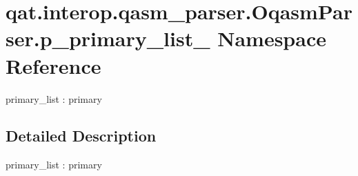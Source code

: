 \hypertarget{namespaceqat_1_1interop_1_1qasm__parser_1_1OqasmParser_1_1p__primary__list__0}{\section{qat.\-interop.\-qasm\-\_\-parser.\-Oqasm\-Parser.\-p\-\_\-primary\-\_\-list\-\_ Namespace Reference}
\label{namespaceqat_1_1interop_1_1qasm__parser_1_1OqasmParser_1_1p__primary__list__0}
}


primary\-\_\-list \-: primary  




\subsection{Detailed Description}
primary\-\_\-list \-: primary 